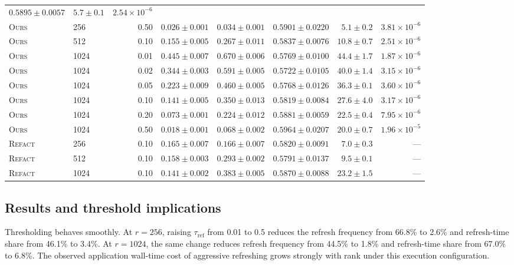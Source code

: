 \documentclass[11pt]{article}
\newcommand{\ours}{\textsc{Ours}}
\newcommand{\refact}{\textsc{Refact}}
\newcommand{\tref}{\tau_{\mathrm{ref}}}
\begin{document}
\begin{landscape}
\begin{longtable}{@{}llrrrrrr@{}}
\(0.5895\pm0.0057\) & \(5.7\pm0.1\) & \(2.54{\times}10^{-6}\) \\
\ours & 256 & 0.50 & \(0.026\pm0.001\) & \(0.034\pm0.001\) &
\(0.5901\pm0.0220\) & \(5.1\pm0.2\) & \(3.81{\times}10^{-6}\) \\
\midrule
\ours & 512 & 0.10 & \(0.155\pm0.005\) & \(0.267\pm0.011\) &
\(0.5837\pm0.0076\) & \(10.8\pm0.7\) & \(2.51{\times}10^{-6}\) \\
\midrule
\ours & 1024 & 0.01 & \(0.445\pm0.007\) & \(0.670\pm0.006\) &
\(0.5769\pm0.0100\) & \(44.4\pm1.7\) & \(1.87{\times}10^{-6}\) \\
\ours & 1024 & 0.02 & \(0.344\pm0.003\) & \(0.591\pm0.005\) &
\(0.5722\pm0.0105\) & \(40.0\pm1.4\) & \(3.15{\times}10^{-6}\) \\
\ours & 1024 & 0.05 & \(0.223\pm0.009\) & \(0.460\pm0.005\) &
\(0.5768\pm0.0126\) & \(36.3\pm0.1\) & \(3.60{\times}10^{-6}\) \\
\ours & 1024 & 0.10 & \(0.141\pm0.005\) & \(0.350\pm0.013\) &
\(0.5819\pm0.0084\) & \(27.6\pm4.0\) & \(3.17{\times}10^{-6}\) \\
\ours & 1024 & 0.20 & \(0.073\pm0.001\) & \(0.224\pm0.012\) &
\(0.5881\pm0.0059\) & \(22.5\pm0.4\) & \(7.95{\times}10^{-6}\) \\
\ours & 1024 & 0.50 & \(0.018\pm0.001\) & \(0.068\pm0.002\) &
\(0.5964\pm0.0207\) & \(20.0\pm0.7\) & \(1.96{\times}10^{-5}\) \\
\midrule
\refact & 256 & 0.10 & \(0.165\pm0.007\) & \(0.166\pm0.007\) &
\(0.5820\pm0.0091\) & \(7.0\pm0.3\) & --- \\
\refact & 512 & 0.10 & \(0.158\pm0.003\) & \(0.293\pm0.002\) &
\(0.5791\pm0.0137\) & \(9.5\pm0.1\) & --- \\
\refact & 1024 & 0.10 & \(0.141\pm0.002\) & \(0.383\pm0.005\) &
\(0.5870\pm0.0088\) & \(23.2\pm1.5\) & --- \\
\bottomrule
\end{longtable}
\end{landscape}

\subsection{Results and threshold implications}

Thresholding behaves smoothly.  At \(r=256\), raising \(\tref\) from 0.01 to
0.5 reduces the refresh frequency from 66.8\% to 2.6\% and refresh-time share
from 46.1\% to 3.4\%.  At \(r=1024\), the same change reduces refresh
frequency from 44.5\% to 1.8\% and refresh-time share from 67.0\% to 6.8\%.
The observed application wall-time cost of aggressive refreshing grows
strongly with rank under this execution configuration.
\end{document}
